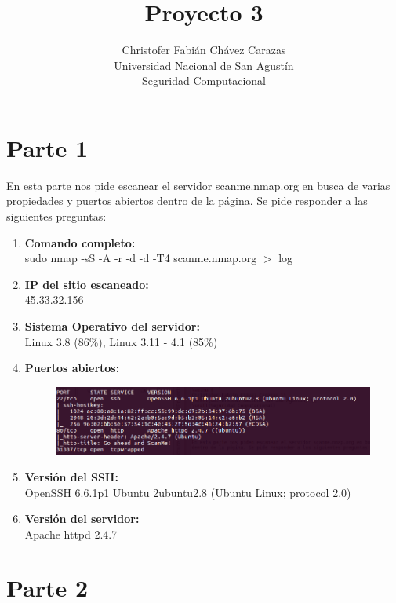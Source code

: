 \documentclass[a4paper,12pt]{article}
\begin{document}
\title{Proyecto 3}
\author{
Christofer Fabián Chávez Carazas \\
\small{Universidad Nacional de San Agustín} \\
\small{Seguridad Computacional}
}

\maketitle

\section{Parte 1}

En esta parte nos pide escanear el servidor scanme.nmap.org en busca de varias propiedades y puertos abiertos
dentro de la página. Se pide responder a las siguientes preguntas:

\begin{enumerate}
 \item \textbf{Comando completo:} \\
 sudo nmap -sS -A -r -d -d -T4 scanme.nmap.org $>$ log
 \item \textbf{IP del sitio escaneado:} \\
 45.33.32.156
 \item \textbf{Sistema Operativo del servidor:} \\
 Linux 3.8 (86\%), Linux 3.11 - 4.1 (85\%)
 \item \textbf{Puertos abiertos:} \\
 \begin{figure}[H]
  \centering
  \includegraphics[scale = 0.5]{1.png}
 \end{figure}
 \item \textbf{Versión del SSH:} \\
  OpenSSH 6.6.1p1 Ubuntu 2ubuntu2.8 (Ubuntu Linux; protocol 2.0)
  \item \textbf{Versión del servidor:} \\
  Apache httpd 2.4.7
\end{enumerate}

\section{Parte 2}
\end{document}
